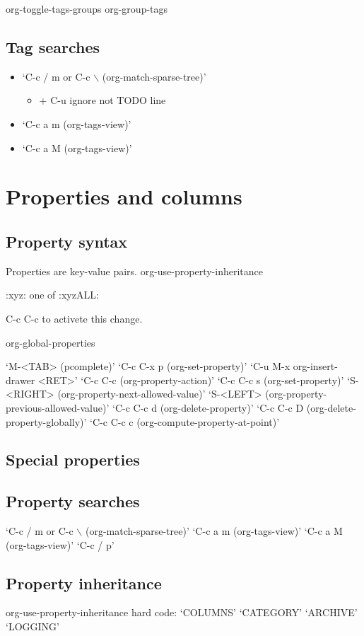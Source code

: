 \documentclass[11pt]{article}
\begin{document}
org-toggle-tags-groups
org-group-tags
\subsection{Tag searches}
\label{sec:orgc537d96}
\begin{itemize}
\item ‘C-c / m  or  C-c $\backslash$     (org-match-sparse-tree)’
\begin{itemize}
\item + C-u ignore not TODO line
\end{itemize}
\item ‘C-c a m     (org-tags-view)’
\item ‘C-c a M     (org-tags-view)’
\end{itemize}
\section{Properties and columns}
\label{sec:org2c66813}
\subsection{Property syntax}
\label{sec:orgbff0698}
Properties are key-value pairs.
org-use-property-inheritance

:xyz: one of :xyzALL:

C-c C-c to activete this change.

org-global-properties

‘M-<TAB>     (pcomplete)’
‘C-c C-x p     (org-set-property)’
‘C-u M-x org-insert-drawer <RET>’
‘C-c C-c     (org-property-action)’
‘C-c C-c s     (org-set-property)’
‘S-<RIGHT>     (org-property-next-allowed-value)’
‘S-<LEFT>     (org-property-previous-allowed-value)’
‘C-c C-c d     (org-delete-property)’
‘C-c C-c D     (org-delete-property-globally)’
‘C-c C-c c     (org-compute-property-at-point)’
\subsection{Special properties}
\label{sec:orgb23c3c1}
\subsection{Property searches}
\label{sec:orgf1cb5e3}
‘C-c / m  or  C-c $\backslash$     (org-match-sparse-tree)’
‘C-c a m     (org-tags-view)’
‘C-c a M     (org-tags-view)’
‘C-c / p’
\subsection{Property inheritance}
\label{sec:org84b3d43}
org-use-property-inheritance
hard code:
‘COLUMNS’
‘CATEGORY’
‘ARCHIVE’
‘LOGGING’
\end{document}
